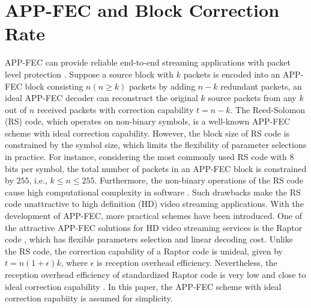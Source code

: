 \documentclass[journal]{IEEEtran}
\begin{document}
\section{APP-FEC and Block Correction Rate}
APP-FEC can provide reliable end-to-end streaming applications with packet level protection \cite{LuSW08}. Suppose a source block with $k$ packets is encoded into an APP-FEC block consisting $n \left(n\geq k\right)$ packets by adding $n-k$ redundant packets, an ideal APP-FEC decoder can reconstruct the original $k$ source packets from any $k$ out of $n$ received packets \cite{LuSW08} with correction capability $t=n-k$. The Reed-Solomon (RS) code, which operates on non-binary symbols, is a well-known APP-FEC scheme with ideal correction capability. However, the block size of RS code is constrained by the symbol size, which limits the flexibility of parameter selections in practice. For instance, considering the most commonly used RS code with $8$ bits per symbol, the total number of packets in an APP-FEC block is constrained by $255$, i.e., $k\leq n \leq 255$. Furthermore, the non-binary operations of the RS code cause high computational complexity in software \cite{LuSW08}. Such drawbacks make the RS code unattractive to high definition (HD) video streaming applications. With the development of APP-FEC, more practical schemes have been introduced. One of the attractive APP-FEC solutions for HD video streaming services is the Raptor code \cite{Shok06}, which has flexible parameters selection and linear decoding cost. Unlike the RS code, the correction capability of a Raptor code is unideal, given by $t=n\left(1+\epsilon\right)k$, where $\epsilon$ is reception overhead efficiency. Nevertheless, the reception overhead efficiency of standardized Raptor code is very low and close to ideal correction capability \cite{LuSW08}. In this paper, the APP-FEC scheme with ideal correction capabiity is assumed for simplicity.
\end{document}
